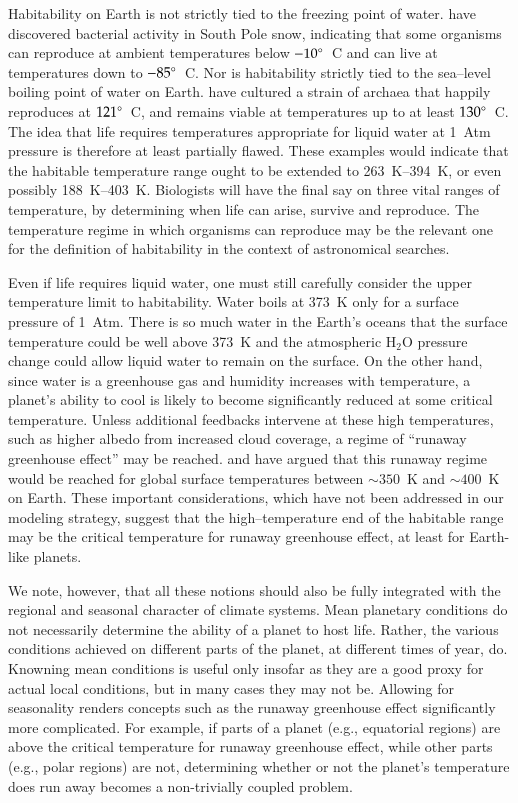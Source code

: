 Habitability on Earth is not strictly tied to the freezing point of
water.  \citet{carpenter_et_al2000} have discovered bacterial activity
in South Pole snow, indicating that some organisms can reproduce at
ambient temperatures below $-10\mbox{$^\circ$}$~C and can live at temperatures
down to $-85\mbox{$^\circ$}$~C.  Nor is habitability strictly tied to the
sea--level boiling point of water on Earth. \citet{kashefi+lovley2003}
have cultured a strain of archaea that happily reproduces at
$121\mbox{$^\circ$}$~C, and remains viable at temperatures up to at least
$130\mbox{$^\circ$}$~C.  The idea that life requires temperatures appropriate
for liquid water at 1~Atm pressure is therefore at least partially
flawed.  These examples would indicate that the habitable temperature
range ought to be extended to 263~K--394~K, or even possibly
188~K--403~K.  Biologists will have the final say on three vital
ranges of temperature, by determining when life can arise, survive and
reproduce.  The temperature regime in which organisms can reproduce
may be the relevant one for the definition of habitability in the
context of astronomical searches.

Even if life requires liquid water, one must still carefully consider
the upper temperature limit to habitability.  Water boils at 373~K
only for a surface pressure of 1~Atm.  There is so much water in the
Earth's oceans that the surface temperature could be well above 373~K
and the atmospheric H$_2$O pressure change could allow liquid water to
remain on the surface.  On the other hand, since water is a greenhouse
gas and humidity increases with temperature, a planet's ability to
cool is likely to become significantly reduced at some critical
temperature.  Unless additional feedbacks intervene at these high
temperatures, such as higher albedo from increased cloud coverage, a
regime of ``runaway greenhouse effect'' may be reached.
\citet{kasting1988} and \citet{sugiyama_et_al2005} have argued that
this runaway regime would be reached for global surface temperatures
between $\sim350$~K and $\sim400$~K on Earth.  These important
considerations, which have not been addressed in our modeling
strategy, suggest that the high--temperature end of the habitable
range may be the critical temperature for runaway greenhouse effect,
at least for Earth-like planets.

We note, however, that all these notions should also be fully
integrated with the regional and seasonal character of climate
systems.  Mean planetary conditions do not necessarily determine the
ability of a planet to host life. Rather, the various conditions
achieved on different parts of the planet, at different times of year,
do.  Knowning mean conditions is useful only insofar as they are a
good proxy for actual local conditions, but in many cases they may not
be.  Allowing for seasonality renders concepts such as the runaway
greenhouse effect significantly more complicated.  For example, if
parts of a planet (e.g., equatorial regions) are above the critical
temperature for runaway greenhouse effect, while other parts (e.g.,
polar regions) are not, determining whether or not the planet's
temperature does run away becomes a non-trivially coupled problem.

